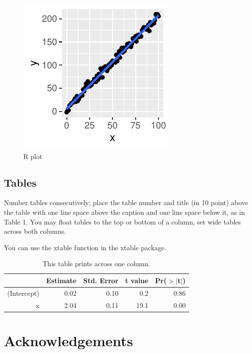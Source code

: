 \documentclass[10pt, letterpaper]{article}
\newenvironment{CodeChunk}{}{}
\begin{document}
\begin{CodeChunk}
\begin{figure}[H]

{\centering \includegraphics{figs/plot-1} 

}

\caption[R plot]{R plot}\label{fig:plot}
\end{figure}
\end{CodeChunk}

\hypertarget{tables}{%
\subsection{Tables}\label{tables}}

Number tables consecutively; place the table number and title (in 10
point) above the table with one line space above the caption and one
line space below it, as in Table 1. You may float tables to the top or
bottom of a column, set wide tables across both columns.

You can use the xtable function in the xtable package.

\begin{table}[H]
\centering
\begin{tabular}{rrrrr}
  \hline
 & Estimate & Std. Error & t value & Pr($>$$|$t$|$) \\ 
  \hline
(Intercept) & 0.02 & 0.10 & 0.2 & 0.86 \\ 
  x & 2.04 & 0.11 & 19.1 & 0.00 \\ 
   \hline
\end{tabular}
\caption{This table prints across one column.} 
\end{table}

\hypertarget{acknowledgements}{%
\section{Acknowledgements}\label{acknowledgements}}
\end{document}
